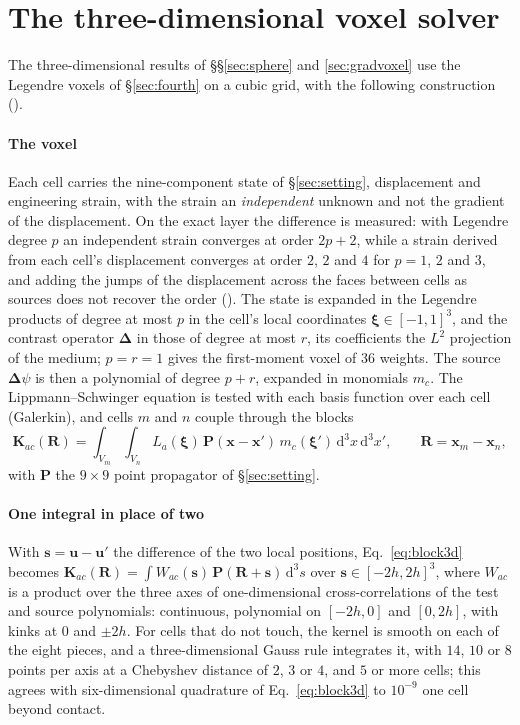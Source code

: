 \documentclass[preprint,review,12pt]{elsarticle}
\newcommand{\bK}{\mathbf{K}}
\newcommand{\bP}{\mathbf{P}}
\newcommand{\bD}{\boldsymbol{\Delta}}
\newcommand{\dd}{\mathrm{d}}
\begin{document}
\FloatBarrier

\section{The three-dimensional voxel solver}\label{app:solver}

The three-dimensional results of \S\S\ref{sec:sphere} and \ref{sec:gradvoxel} use the Legendre voxels
of \S\ref{sec:fourth} on a cubic grid, with the following construction
().

\paragraph{The voxel} Each cell carries the nine-component state of \S\ref{sec:setting}, displacement
and engineering strain, with the strain an \emph{independent} unknown and not the gradient of the
displacement. On the exact layer the difference is measured: with Legendre degree $p$ an independent
strain converges at order $2p+2$, while a strain derived from each cell's displacement converges at
order $2$, $2$ and $4$ for $p=1$, $2$ and $3$, and adding the jumps of the displacement across the faces
between cells as sources does not recover the order
(). The state is expanded in the Legendre
products of degree at most $p$ in the cell's local coordinates $\boldsymbol\xi\in[-1,1]^3$, and the
contrast operator $\bD$ in those of degree at most $r$, its coefficients the $L^2$ projection of the
medium; $p=r=1$ gives the first-moment voxel of $36$ weights. The source $\bD\psi$ is then a polynomial
of degree $p+r$, expanded in monomials $m_c$. The Lippmann--Schwinger equation is tested with each basis
function over each cell (Galerkin), and cells $m$ and $n$ couple through the blocks
\begin{equation}\label{eq:block3d}
  \bK_{ac}(\mathbf{R})=\int_{V_m}\!\int_{V_n}L_a(\boldsymbol\xi)\,\bP(\mathbf{x}-\mathbf{x}')\,
  m_c(\boldsymbol\xi')\,\dd^3x\,\dd^3x',\qquad \mathbf{R}=\mathbf{x}_m-\mathbf{x}_n,
\end{equation}
with $\bP$ the $9\times9$ point propagator of \S\ref{sec:setting}.

\paragraph{One integral in place of two} With $\mathbf{s}=\mathbf{u}-\mathbf{u}'$ the difference of the
two local positions, Eq.~\eqref{eq:block3d} becomes
$\bK_{ac}(\mathbf{R})=\int W_{ac}(\mathbf{s})\,\bP(\mathbf{R}+\mathbf{s})\,\dd^3s$ over
$\mathbf{s}\in[-2h,2h]^3$, where $W_{ac}$ is a product over the three axes of one-dimensional
cross-correlations of the test and source polynomials: continuous, polynomial on $[-2h,0]$ and $[0,2h]$,
with kinks at $0$ and $\pm2h$. For cells that do not touch, the kernel is smooth on each of the eight
pieces, and a three-dimensional Gauss rule integrates it, with $14$, $10$ or $8$ points per axis at a
Chebyshev distance of $2$, $3$ or $4$, and $5$ or more cells; this agrees with six-dimensional quadrature
of Eq.~\eqref{eq:block3d} to $10^{-9}$ one cell beyond contact.
\end{document}
